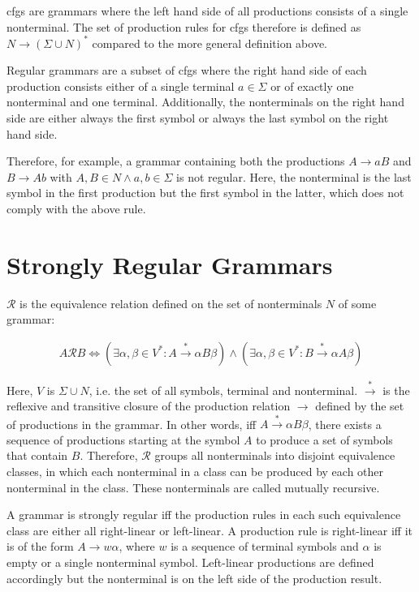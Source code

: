 \Acfp{cfg} are grammars where the left hand side of all productions consists of a single nonterminal. The set of production rules for \acp{cfg} therefore is defined as $N \rightarrow (\Sigma \cup N)^*$ compared to the more general definition above.

Regular grammars are a subset of \acp{cfg} where the right hand side of each production consists either of a single terminal $a \in \Sigma$ or of exactly one nonterminal and one terminal. Additionally, the nonterminals on the right hand side are either always the first symbol or always the last symbol on the right hand side. 

Therefore, for example, a grammar containing both the productions $A \rightarrow aB$ and $B \rightarrow Ab$ with $A, B \in N \land a, b \in \Sigma$ is not regular. Here, the nonterminal is the last symbol in the first production but the first symbol in the latter, which does not comply with the above rule.

\section{Strongly Regular Grammars}\label{sec:background:srg}

$\mathcal{R}$ is the equivalence relation defined on the set of nonterminals $N$ of some grammar:

\begin{align}
	A \mathcal{R} B \Leftrightarrow (\exists \alpha, \beta \in V^* : A \xrightarrow{*} \alpha B \beta) \land (\exists \alpha, \beta \in V^* : B \xrightarrow{*} \alpha A \beta) 
\end{align}

Here, $V$ is $\Sigma \cup N$, i.e. the set of all symbols, terminal and nonterminal. $\xrightarrow{*}$ is the reflexive and transitive closure of the production relation $\rightarrow$ defined by the set of productions in the grammar. In other words, iff $A \xrightarrow{*} \alpha B \beta$, there exists a sequence of productions starting at the symbol $A$ to produce a set of symbols that contain $B$. Therefore, $\mathcal{R}$ groups all nonterminals into disjoint equivalence classes, in which each nonterminal in a class can be produced by each other nonterminal in the class. These nonterminals are called mutually recursive.

A grammar is strongly regular iff the production rules in each such equivalence class are either all right-linear or left-linear.
A production rule is right-linear iff it is of the form $A \rightarrow w \alpha$, where $w$ is a sequence of terminal symbols and $\alpha$ is empty or a single nonterminal symbol. Left-linear productions are defined accordingly but the nonterminal is on the left side of the production result.

